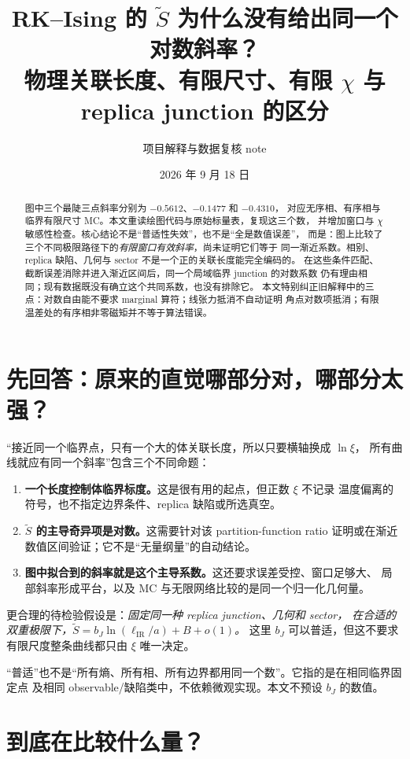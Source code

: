 \documentclass[11pt]{article}
\title{RK--Ising 的 $\widetilde S$ 为什么没有给出同一个对数斜率？\\
\large 物理关联长度、有限尺寸、有限 $\chi$ 与 replica junction 的区分}
\author{项目解释与数据复核 note}
\date{2026 年 9 月 18 日}
\newcommand{\tS}{\widetilde S}
\newcommand{\note}[1]{\par\noindent\colorbox{blue!5}{\parbox{0.95\linewidth}{#1}}\par}
\begin{document}
\maketitle
\begin{abstract}
图中三个最陡三点斜率分别为 $-0.5612$、$-0.1477$ 和 $-0.4310$，
对应无序相、有序相与临界有限尺寸 MC。本文重读绘图代码与原始标量表，复现这三个数，
并增加窗口与 $\chi$ 敏感性检查。核心结论不是“普适性失效”，也不是“全是数值误差”，
而是：图上比较了三个不同极限路径下的\emph{有限窗口有效斜率}，尚未证明它们等于
同一渐近系数。相别、replica 缺陷、几何与 sector 不是一个正的关联长度能完全编码的。
在这些条件匹配、截断误差消除并进入渐近区间后，同一个局域临界 junction 的对数系数
仍有理由相同；现有数据既没有确立这个共同系数，也没有排除它。
本文特别纠正旧解释中的三点：对数自由能不要求 marginal 算符；线张力抵消不自动证明
角点对数项抵消；有限温差处的有序相非零磁矩并不等于算法错误。
\end{abstract}
\tableofcontents

\section{先回答：原来的直觉哪部分对，哪部分太强？}
“接近同一个临界点，只有一个大的体关联长度，所以只要横轴换成 $\ln\xi$，
所有曲线就应有同一个斜率”包含三个不同命题：
\begin{enumerate}
\item \textbf{一个长度控制体临界标度。}这是很有用的起点，但正数 $\xi$ 不记录
温度偏离的符号，也不指定边界条件、replica 缺陷或所选真空。
\item \textbf{$\tS$ 的主导奇异项是对数。}这需要针对该 partition-function ratio
证明或在渐近数值区间验证；它不是“无量纲量”的自动结论。
\item \textbf{图中拟合到的斜率就是这个主导系数。}这还要求误差受控、窗口足够大、
局部斜率形成平台，以及 MC 与无限网络比较的是同一个归一化几何量。
\end{enumerate}
\note{更合理的待检验假设是：\emph{固定同一种 replica junction、几何和 sector，
在合适的双重极限下，$\tS=b_J\ln(\ell_{\mathrm{IR}}/a)+B+o(1)$。}
这里 $b_J$ 可以普适，但这不要求有限尺度整条曲线都只由 $\xi$ 唯一决定。}
“普适”也不是“所有熵、所有相、所有边界都用同一个数”。它指的是在相同临界固定点
及相同 observable/缺陷类中，不依赖微观实现。本文不预设 $b_J$ 的数值。

\section{到底在比较什么量？}
\end{document}
